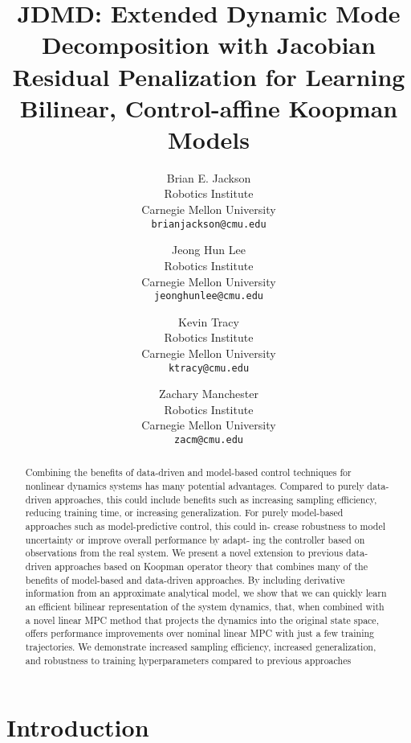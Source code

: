 \documentclass{article}
\title{JDMD: Extended Dynamic Mode Decomposition with Jacobian Residual Penalization
for Learning Bilinear, Control-affine Koopman Models}
\author{
Brian E. Jackson \\
Robotics Institute \\
Carnegie Mellon University\\
\texttt{brianjackson@cmu.edu} \\
\and
Jeong Hun Lee \\
Robotics Institute\\
Carnegie Mellon University\\
\texttt{jeonghunlee@cmu.edu} \\
\and
Kevin Tracy \\
Robotics Institute\\
Carnegie Mellon University\\
\texttt{ktracy@cmu.edu} \\
\and
Zachary Manchester \\
Robotics Institute\\
Carnegie Mellon University\\
\texttt{zacm@cmu.edu} \\
}
\begin{document}
\maketitle

\begin{abstract}
  Combining the benefits of data-driven and model-based control techniques for nonlinear
  dynamics systems has many potential advantages. Compared to purely data-driven approaches,
  this could include benefits such as increasing sampling efficiency, reducing training
  time, or increasing generalization. For purely model-based approaches such as
  model-predictive control, this could in- crease robustness to model uncertainty or improve
  overall performance by adapt- ing the controller based on observations from the real
  system. We present a novel extension to previous data-driven approaches based on Koopman
  operator theory that combines many of the benefits of model-based and data-driven
  approaches.  By including derivative information from an approximate analytical model, we
  show that we can quickly learn an efficient bilinear representation of the system
  dynamics, that, when combined with a novel linear MPC method that projects the dynamics
  into the original state space, offers performance improvements over nominal linear MPC
  with just a few training trajectories. We demonstrate increased sampling efficiency,
  increased generalization, and robustness to training hyperparameters compared to previous
  approaches
\end{abstract}

\section{Introduction}
\end{document}
